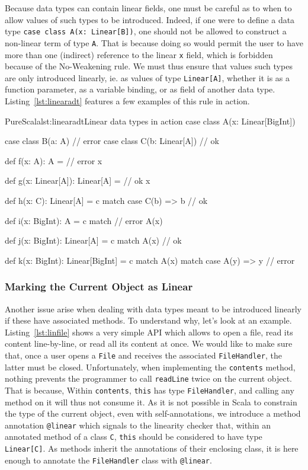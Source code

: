 \documentclass[a4paper,twoside]{article}
\newcommand{\RefCode}[1]{Listing~\ref{#1}}
\newcommand{\stt}[1]{\texttt{\small{#1}}}
\begin{document}
Because data types can contain linear fields, one must be careful as to when to allow values of such types to be introduced. Indeed, if one were to define a data type \stt{case class A(x:\,Linear[B])}, one should not be allowed to construct a non-linear term of type \stt{A}. That is because doing so would permit the user to have more than one (indirect) reference to the linear \stt{x} field, which is forbidden because of the No-Weakening rule. We must thus ensure that values such types are only introduced linearly, ie. as values of type \stt{Linear[A]}, whether it is as a function parameter, as a variable binding, or as field of another data type. \RefCode{lst:linearadt} features a few examples of this rule in action.

\begin{Code}{PureScala}{lst:linearadt}{Linear data types in action}
case class A(x: Linear[BigInt])

case class B(a: A)          // error
case class C(b: Linear[A])  // ok

def f(x: A): A = { // error
  x
}

def g(x: Linear[A]): Linear[A] = { // ok
  x
}

def h(x: C): Linear[A] = c match {
  case C(b) => b // ok
}

def i(x: BigInt): A = c match { // error
  A(x)
}

def j(x: BigInt): Linear[A] = c match {
  A(x) // ok
}

def k(x: BigInt): Linear[BigInt] = c match {
  A(x) match {
    case A(y) => y // error
  }
}
\end{Code}

\subsubsection{Marking the Current Object as Linear}

Another issue arise when dealing with data types meant to be introduced linearly if these have associated methods. To understand why, let's look at an example. \RefCode{lst:linfile} shows a very simple API which allows to open a file, read its content line-by-line, or read all its content at once. We would like to make sure that, once a user opens a \stt{File} and receives the associated \stt{FileHandler}, the latter must be closed. Unfortunately, when implementing the \stt{contents} method, nothing prevents the programmer to call \stt{readLine} twice on the current object. That is because, Within \stt{contents}, \stt{this} has type \stt{FileHandler}, and calling any method on it will thus not consume it. As it is not possible in Scala to constrain the type of the current object, even with self-annotations, we introduce a method annotation \stt{@linear} which signals to the linearity checker that, within an annotated method of a class \stt{C}, \stt{this} should be considered to have type \stt{Linear[C]}. As methods inherit the annotations of their enclosing class, it is here enough to annotate the \stt{FileHandler} class with \stt{@linear}.
\end{document}

